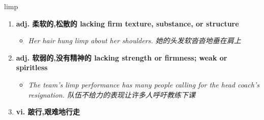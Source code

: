 
\begin{frame}
{\huge limp}
\begin{center}
\begin{enumerate}\Large
  \item \textbf{adj. 柔软的,松散的 lacking firm texture, substance, or structure}
  \begin{itemize}
    \item \em{\Large{Her hair hung limp about her shoulders. 她的头发软沓沓地垂在肩上}}
  \end{itemize}
  \item \textbf{adj. 软弱的,没有精神的 lacking strength or firmness; weak or spiritless}
  \begin{itemize}
    \item \em{\Large{The team's limp performance has many people calling for the head coach's resignation. 队伍不给力的表现让许多人呼吁教练下课}}
  \end{itemize}
  \item \textbf{vi. 跛行,艰难地行走}
\end{enumerate}
\end{center}
\end{frame}
